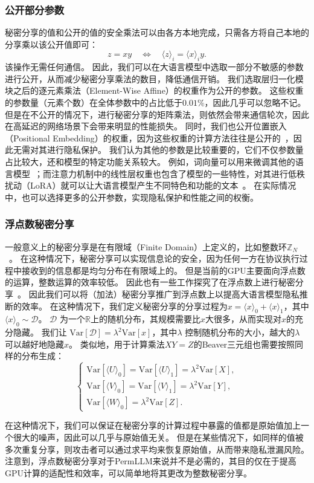 \subsubsection{公开部分参数}
秘密分享的值和公开的值的安全乘法可以由各方本地完成，只需各方将自己本地的分享乘以该公开值即可：
\begin{equation}
    z = xy \quad \Leftrightarrow \quad \langle z \rangle_i = \langle x \rangle_i y.
\end{equation}
该操作无需任何通信。
%
因此，我们可以在大语言模型中选取一部分不敏感的参数进行公开，从而减少秘密分享乘法的数目，降低通信开销。
%
我们选取层归一化模块之后的逐元素乘法（Element-Wise Affine）的权重作为公开的参数。
%
这些权重的参数量（元素个数）在全体参数中的占比低于$0.01\%$，因此几乎可以忽略不记。
但是在不公开的情况下，进行秘密分享的矩阵乘法，则依然会带来通信轮次，因此在高延迟的网络场景下会带来明显的性能损失。
%
同时，我们也公开位置嵌入（Positional Embedding）的权重，因为这些权重的计算方法往往是公开的~\cite{devlin_2019_bert,sujianlin_2024_rope}，因此无需对其进行隐私保护。
%
我们认为其他的参数是比较重要的，它们不仅参数量占比较大，还和模型的特定功能关系较大。
%
例如，词向量可以用来微调其他的语言模型~\cite{yeqi_2018_word_embedding_translation,lample_2016_ner}；而注意力机制中的线性层权重也包含了模型的一些特性，对其进行低秩扰动（LoRA）就可以让大语言模型产生不同特色和功能的文本~\cite{edward_2022_lora}。
%
在实际情况中，也可以选择更多的公开参数，实现隐私保护和性能之间的权衡。

%
\subsubsection{浮点数秘密分享}
一般意义上的秘密分享是在有限域（Finite Domain）上定义的，比如整数环$\mathbb Z_N$~\cite{shamir1979share}。
在这种情况下，秘密分享可以实现信息论的安全，因为任何一方在协议执行过程中接收到的信息都是均匀分布在有限域上的。
%
但是当前的GPU主要面向浮点数的运算，整数运算的效率较低。
因此也有一些工作探究了在浮点数上进行秘密分享~\cite{tjell_2021_real_sharing,gundersen_2023_real_sharing}。
因此我们可以将（加法）秘密分享推广到浮点数上以提高大语言模型隐私推断的效率。
%
在这种情况下，我们定义秘密分享的分享过程为$x = \langle x \rangle_0 + \langle x \rangle_1$，其中 $\langle x \rangle_0 \sim \mathcal D$。
%
$\mathcal D$ 为一个$\mathbb R$上的随机分布，其规模需要比$x$大很多，从而实现对$x$的充分隐藏。
%
我们让 $\text{Var}[\mathcal D] = \lambda^2 \text{Var}[x]$，其中$\lambda$ 控制随机分布的大小，越大的$\lambda$ 可以越好地隐藏$x$。
%
类似地，用于计算乘法$XY=Z$的Beaver三元组也需要按照同样的分布生成：
\begin{equation}
\begin{cases}
    \text{Var}[\langle U \rangle_0] = \text{Var}[\langle U \rangle_1] = \lambda^2 \text{Var}[X], \\
    \text{Var}[\langle V \rangle_0] = \text{Var}[\langle V \rangle_1] = \lambda^2 \text{Var}[Y], \\
    \text{Var}[\langle W \rangle_0] = \lambda^2 \text{Var}[Z].
\end{cases}
\end{equation}
%

在这种情况下，我们可以保证在秘密分享的计算过程中暴露的值都是原始值加上一个很大的噪声，因此可以几乎与原始值无关。
%
但是在某些情况下，如同样的值被多次重复分享，则攻击者可以通过求平均来恢复原始值，从而带来隐私泄漏风险。
%
注意到，浮点数秘密分享对于PermLLM来说并不是必需的，其目的仅在于提高GPU计算的适配性和效率，可以简单地将其更改为整数秘密分享。
%


